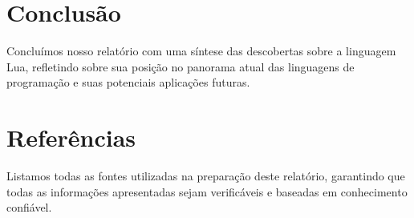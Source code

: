 \documentclass[12pt]{article}
\begin{document}
\section{Conclusão}
Concluímos nosso relatório com uma síntese das descobertas sobre a linguagem Lua, refletindo sobre sua posição no panorama atual das linguagens de programação e suas potenciais aplicações futuras.

\section{Referências}
Listamos todas as fontes utilizadas na preparação deste relatório, garantindo que todas as informações apresentadas sejam verificáveis e baseadas em conhecimento confiável.
\end{document}
